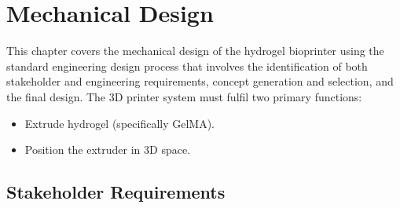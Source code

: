 \chapter{Mechanical Design}

This chapter covers the mechanical design of the hydrogel bioprinter using the standard engineering design process that involves the identification of both stakeholder and engineering requirements, concept generation and selection, and the final design. The 3D printer system must fulfil two primary functions:
\begin{itemize}
    \item Extrude hydrogel (specifically GelMA).
    \item Position the extruder in 3D space.
\end{itemize}


\section{Stakeholder Requirements}


